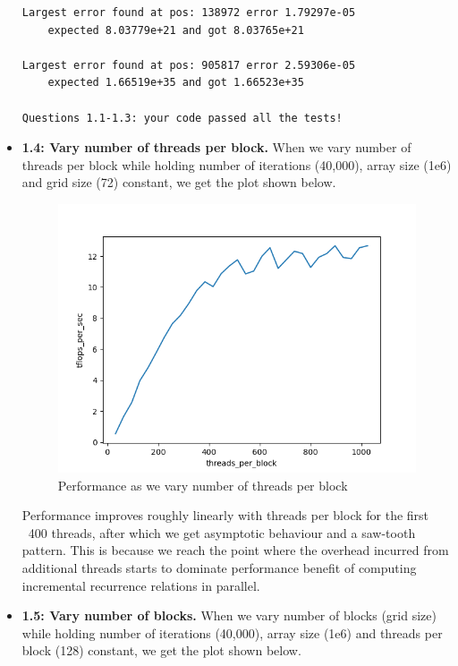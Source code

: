 \documentclass[12pt,letterpaper,twoside]{article}
\begin{document}
\begin{itemize}
\begin{verbatim}
Largest error found at pos: 138972 error 1.79297e-05 
    expected 8.03779e+21 and got 8.03765e+21

Largest error found at pos: 905817 error 2.59306e-05 
    expected 1.66519e+35 and got 1.66523e+35

Questions 1.1-1.3: your code passed all the tests!
\end{verbatim}

    \item \textbf{1.4: Vary number of threads per block.} When we 
    vary number of threads per block while holding number of 
    iterations (40,000), array size (1e6) and grid size (72) 
    constant, we get the plot shown below. 
    
    \begin{figure}[h]
        \center
        \includegraphics[scale=0.7]{q1_4.png}
        \caption{Performance as we vary number of threads per block}
    \end{figure}

    Performance improves roughly linearly with threads per block 
    for the first ~400 threads, after which we get asymptotic 
    behaviour and a saw-tooth pattern. This is because we reach 
    the point where the overhead incurred from additional threads
    starts to dominate performance benefit of computing incremental 
    recurrence relations in parallel.

    \item \textbf{1.5: Vary number of blocks.} When we 
    vary number of blocks (grid size) while holding number of 
    iterations (40,000), array size (1e6) and threads per block 
    (128) constant, we get the plot shown below. 


\end{itemize}
\end{document}
